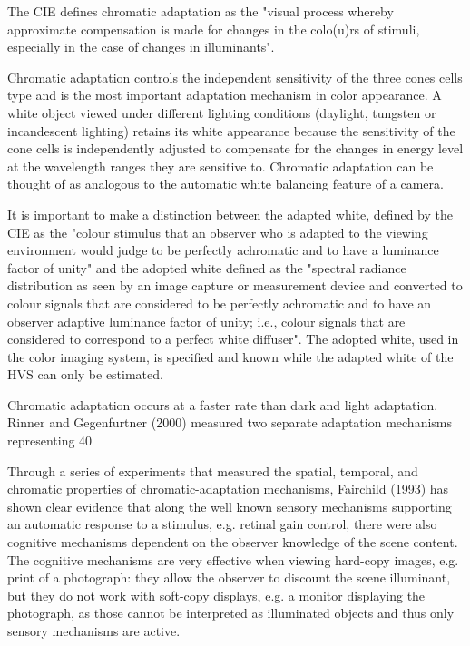 The CIE defines chromatic adaptation as the "visual process whereby approximate compensation is made for changes in the colo(u)rs of stimuli, especially in the case of changes in illuminants".

Chromatic adaptation controls the independent sensitivity of the three cones cells type and is the most important adaptation mechanism in color appearance. A white object viewed under different lighting conditions (daylight, tungsten or incandescent lighting) retains its white appearance because the sensitivity of the cone cells is independently adjusted to compensate for the changes in energy level at the wavelength ranges they are sensitive to. Chromatic adaptation can be thought of as analogous to the automatic white balancing feature of a camera.

It is important to make a distinction between the adapted white, defined by the CIE as the "colour stimulus that an observer who is adapted to the viewing environment would judge to be perfectly achromatic and to have a luminance factor of unity" and the adopted white defined as the "spectral radiance distribution as seen by an image capture or measurement device and converted to colour signals that are considered to be perfectly achromatic and to have an observer adaptive luminance factor of unity; i.e., colour signals that are considered to correspond to a perfect white diffuser". The adopted white, used in the color imaging system, is specified and known while the adapted white of the HVS can only be estimated.

Chromatic adaptation occurs at a faster rate than dark and light adaptation. Rinner and Gegenfurtner (2000) measured two separate adaptation mechanisms representing 40%

Through a series of experiments that measured the spatial, temporal, and chromatic properties of chromatic-adaptation mechanisms, Fairchild (1993) has shown clear evidence that along the well known sensory mechanisms supporting an automatic response to a stimulus, e.g. retinal gain control, there were also cognitive mechanisms dependent on the observer knowledge of the scene content.
The cognitive mechanisms are very effective when viewing hard-copy images, e.g. print of a photograph: they allow the observer to discount the scene illuminant, but they do not work with soft-copy displays, e.g. a monitor displaying the photograph, as those cannot be interpreted as illuminated objects and thus only sensory mechanisms are active.

